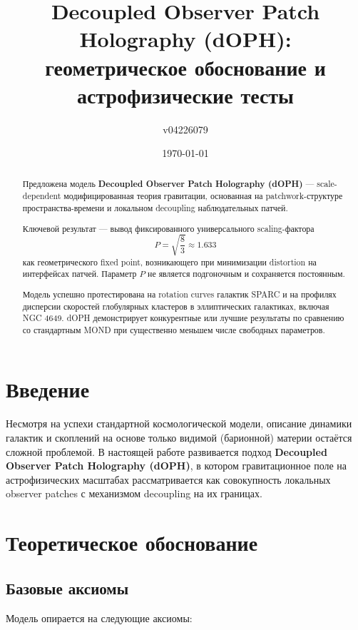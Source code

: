 \documentclass[12pt,a4paper]{article}
\title{Decoupled Observer Patch Holography (dOPH): \\
геометрическое обоснование и астрофизические тесты}
\author{v04226079}
\date{\today}
\begin{document}
\maketitle

\begin{abstract}
Предложена модель \textbf{Decoupled Observer Patch Holography (dOPH)} — scale-dependent модифицированная теория гравитации, основанная на patchwork-структуре пространства-времени и локальном decoupling наблюдательных патчей.

Ключевой результат — вывод фиксированного универсального scaling-фактора 
\[
P = \sqrt{\frac{8}{3}} \approx 1.633
\]
как геометрического fixed point, возникающего при минимизации distortion на интерфейсах патчей. Параметр $P$ не является подгоночным и сохраняется постоянным.

Модель успешно протестирована на rotation curves галактик SPARC и на профилях дисперсии скоростей глобулярных кластеров в эллиптических галактиках, включая NGC 4649. dOPH демонстрирует конкурентные или лучшие результаты по сравнению со стандартным MOND при существенно меньшем числе свободных параметров.
\end{abstract}

\section{Введение}

Несмотря на успехи стандартной космологической модели, описание динамики галактик и скоплений на основе только видимой (барионной) материи остаётся сложной проблемой. В настоящей работе развивается подход \textbf{Decoupled Observer Patch Holography (dOPH)}, в котором гравитационное поле на астрофизических масштабах рассматривается как совокупность локальных observer patches с механизмом decoupling на их границах.

\section{Теоретическое обоснование}

\subsection{Базовые аксиомы}

Модель опирается на следующие аксиомы:
\end{document}
